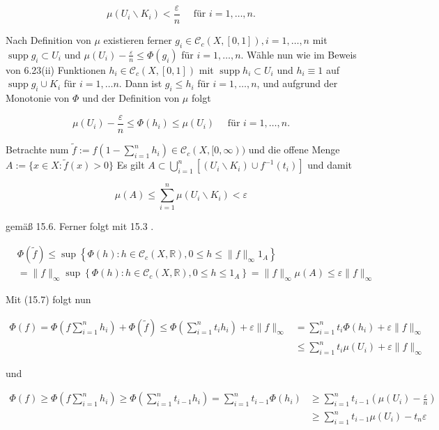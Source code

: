 \documentclass[10pt, letterpaper]{article}
\begin{document}
$$
\mu\left(U_{i} \backslash K_{i}\right)<\frac{\varepsilon}{n} \quad \text { für } i=1, \ldots, n .
$$

Nach Definition von $\mu$ existieren ferner $g_{i} \in \mathcal{C}_{c}(X,[0,1]), i=1, \ldots, n$ mit $\operatorname{supp} g_{i} \subset U_{i}$ und $\mu\left(U_{i}\right)-\frac{\varepsilon}{n} \leq \Phi\left(g_{i}\right)$ für $i=1, \ldots, n$. Wähle nun wie im Beweis von 6.23(ii) Funktionen $h_{i} \in \mathcal{C}_{c}(X,[0,1])$ mit $\operatorname{supp} h_{i} \subset U_{i}$ und $h_{i} \equiv 1$ auf $\operatorname{supp} g_{i} \cup K_{i}$ für $i=1, \ldots n$. Dann ist $g_{i} \leq h_{i}$ für $i=1, \ldots, n$, und aufgrund der Monotonie von $\Phi$ und der Definition von $\mu$ folgt

$$
\mu\left(U_{i}\right)-\frac{\varepsilon}{n} \leq \Phi\left(h_{i}\right) \leq \mu\left(U_{i}\right) \quad \text { für } i=1, \ldots, n .
$$

Betrachte num $\tilde{f}:=f\left(1-\sum_{i=1}^{n} h_{i}\right) \in \mathcal{C}_{c}(X,[0, \infty))$ und die offene Menge $A:=\{x \in X: \tilde{f}(x)>0\}$ Es gilt $A \subset \bigcup_{i=1}^{n}\left[\left(U_{i} \backslash K_{i}\right) \cup f^{-1}\left(t_{i}\right)\right]$ und damit

$$
\mu(A) \leq \sum_{i=1}^{n} \mu\left(U_{i} \backslash K_{i}\right)<\varepsilon
$$

gemäß 15.6. Ferner folgt mit 15.3 .

$$
\begin{aligned}
& \Phi(\tilde{f}) \leq \sup \left\{\Phi(h): h \in \mathcal{C}_{c}(X, \mathbb{R}), 0 \leq h \leq\|f\|_{\infty} 1_{A}\right\} \\
& =\|f\|_{\infty} \sup \left\{\Phi(h): h \in \mathcal{C}_{c}(X, \mathbb{R}), 0 \leq h \leq 1_{A}\right\}=\|f\|_{\infty} \mu(A) \leq \varepsilon\|f\|_{\infty}
\end{aligned}
$$

Mit (15.7) folgt nun

$$
\begin{aligned}
\Phi(f)=\Phi\left(f \sum_{i=1}^{n} h_{i}\right)+\Phi(\tilde{f}) \leq \Phi\left(\sum_{i=1}^{n} t_{i} h_{i}\right)+\varepsilon\|f\|_{\infty} & =\sum_{i=1}^{n} t_{i} \Phi\left(h_{i}\right)+\varepsilon\|f\|_{\infty} \\
& \leq \sum_{i=1}^{n} t_{i} \mu\left(U_{i}\right)+\varepsilon\|f\|_{\infty}
\end{aligned}
$$

und

$$
\begin{aligned}
\Phi(f) \geq \Phi\left(f \sum_{i=1}^{n} h_{i}\right) \geq \Phi\left(\sum_{i=1}^{n} t_{i-1} h_{i}\right)=\sum_{i=1}^{n} t_{i-1} \Phi\left(h_{i}\right) & \geq \sum_{i=1}^{n} t_{i-1}\left(\mu\left(U_{i}\right)-\frac{\varepsilon}{n}\right) \\
& \geq \sum_{i=1}^{n} t_{i-1} \mu\left(U_{i}\right)-t_{n} \varepsilon
\end{aligned}
$$
\end{document}
